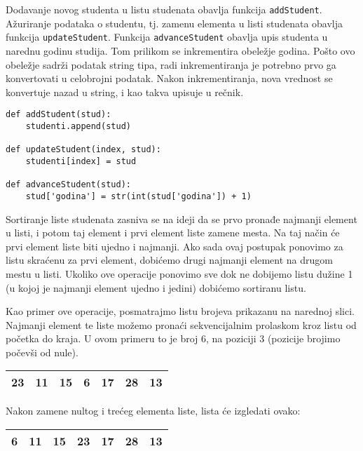 \documentclass[a4paper]{article}
\begin{document}
Dodavanje novog studenta u listu studenata obavlja funkcija \texttt{addStudent}.
Ažuriranje podataka o studentu, tj. zamenu elementa u listi studenata obavlja
funkcija \texttt{updateStudent}. Funkcija \texttt{advanceStudent} obavlja upis
studenta u narednu godinu studija. Tom prilikom se inkrementira obeležje godina.
Pošto ovo obeležje sadrži podatak string tipa, radi inkrementiranja je potrebno
prvo ga konvertovati u celobrojni podatak. Nakon inkrementiranja, nova vrednost
se konvertuje nazad u string, i kao takva upisuje u rečnik.

\begin{verbatim}
def addStudent(stud):
    studenti.append(stud)

def updateStudent(index, stud):
    studenti[index] = stud

def advanceStudent(stud):
    stud['godina'] = str(int(stud['godina']) + 1)
\end{verbatim}

Sortiranje liste studenata zasniva se na ideji da se prvo pronađe najmanji
element u listi, i potom taj element i prvi element liste zamene mesta. Na taj
način će prvi element liste biti ujedno i najmanji. Ako sada ovaj postupak
ponovimo za listu skraćenu za prvi element, dobićemo drugi najmanji element na
drugom mestu u listi. Ukoliko ove operacije ponovimo sve dok ne dobijemo listu
dužine 1 (u kojoj je najmanji element ujedno i jedini) dobićemo sortiranu listu.

Kao primer ove operacije, posmatrajmo listu brojeva prikazanu na narednoj slici.
Najmanji element te liste možemo pronaći sekvencijalnim prolaskom kroz listu od
početka do kraja. U ovom primeru to je broj 6, na poziciji 3 (pozicije brojimo
počevši od nule).

\begin{center}
\begin{tabular}{|c|c|c|c|c|c|c|} \hline
23 & 11 & 15 & \color{red}6 & 17 & 28 & 13 \\ \hline
\end{tabular}
\end{center}

Nakon zamene nultog i trećeg elementa liste, lista će izgledati ovako:

\begin{center}
\begin{tabular}{|c|c|c|c|c|c|c|} \hline
6 & 11 & 15 & 23 & 17 & 28 & 13 \\ \hline
\end{tabular}
\end{center}
\end{document}
